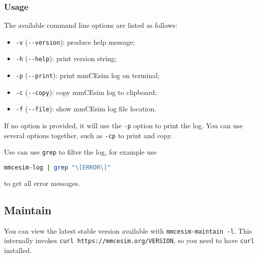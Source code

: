 \subsubsection{Usage}
The available command line options are listed as follows:
\begin{itemize}
  \item
    \texttt{-v}
    (\texttt{-{}-version}):
    produce help message;
  \item
    \texttt{-h}
    (\texttt{-{}-help}):
    print version string;
  \item
    \texttt{-p}
    (\texttt{-{}-print}):
    print mmCEsim log on terminal;
  \item
    \texttt{-c}
    (\texttt{-{}-copy}):
    copy mmCEsim log to clipboard;
  \item
    \texttt{-f}
    (\texttt{-{}-file}):
    show mmCEsim log file location.
\end{itemize}

If no option is provided, it will use the \texttt{-p} option to print the log.
You can use several options together, such as \texttt{-cp} to print and copy.

\begin{tip}
  Use can use \texttt{grep} to filter the log, for example use
  \begin{lstlisting}[language=sh]
mmcesim-log | grep "\[ERROR\]"
  \end{lstlisting}
  to get all error messages.
\end{tip}

\subsection{Maintain}
You can view the latest stable version available with
\texttt{mmcesim-maintain~-l}.
This internally invokes \texttt{curl https://mmcesim.org/VERSION},
so you need to have \texttt{curl} installed.
